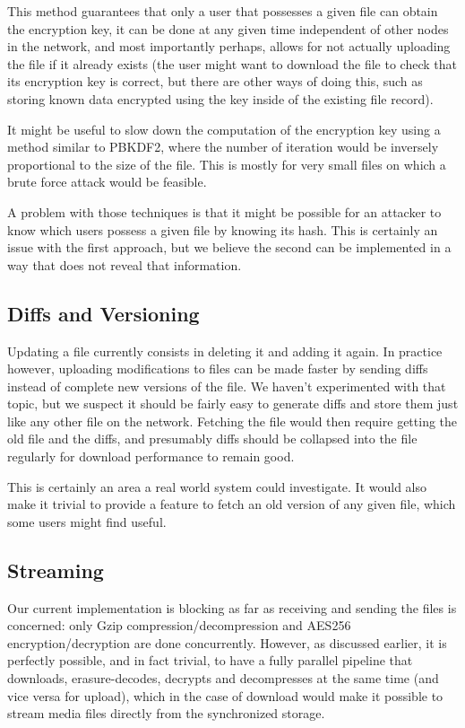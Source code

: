 \documentclass[11pt]{IEEEtran}
\begin{document}
This method guarantees that only a user that possesses a given file can obtain the encryption key, it can be done at any given time independent of other nodes in the network, and most importantly perhaps, allows for not actually uploading the file if it already exists (the user might want to download the file to check that its encryption key is correct, but there are other ways of doing this, such as storing known data encrypted using the key inside of the existing file record).

It might be useful to slow down the computation of the encryption key using a method similar to PBKDF2, where the number of iteration would be inversely proportional to the size of the file. This is mostly for very small files on which a brute force attack would be feasible.

A problem with those techniques is that it might be possible for an attacker to know which users possess a given file by knowing its hash. This is certainly an issue with the first approach, but we believe the second can be implemented in a way that does not reveal that information.

\subsection{Diffs and Versioning}

Updating a file currently consists in deleting it and adding it again. In practice however, uploading modifications to files can be made faster by sending diffs instead of complete new versions of the file. We haven't experimented with that topic, but we suspect it should be fairly easy to generate diffs and store them just like any other file on the network. Fetching the file would then require getting the old file and the diffs, and presumably diffs should be collapsed into the file regularly for download performance to remain good.

This is certainly an area a real world system could investigate. It would also make it trivial to provide a feature to fetch an old version of any given file, which some users might find useful.

\subsection{Streaming}

Our current implementation is blocking as far as receiving and sending the files is concerned: only Gzip compression/decompression and AES256 encryption/decryption are done concurrently. However, as discussed earlier, it is perfectly possible, and in fact trivial, to have a fully parallel pipeline that downloads, erasure-decodes, decrypts and decompresses at the same time (and vice versa for upload), which in the case of download would make it possible to stream media files directly from the synchronized storage.
\end{document}
